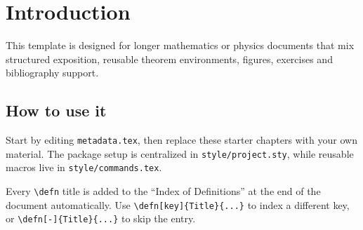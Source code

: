 \chapter{Introduction}


This template is designed for longer mathematics or physics documents that mix
structured exposition, reusable theorem environments, figures, exercises and
bibliography support.

\section{How to use it}

Start by editing \texttt{metadata.tex}, then replace these starter chapters with
your own material. The package setup is centralized in
\texttt{style/project.sty}, while reusable macros live in
\texttt{style/commands.tex}.


Every \verb|\defn| title is added to the ``Index of Definitions'' at the end of
the document automatically. Use \verb|\defn[key]{Title}{...}| to index a
different key, or \verb|\defn[-]{Title}{...}| to skip the entry.


\citep{HaiounDefiningextendedTQFTshandleattachments2026}
\citep{AmbrosinoMonodromydefectsChernSimonstheoryHolography2026}
